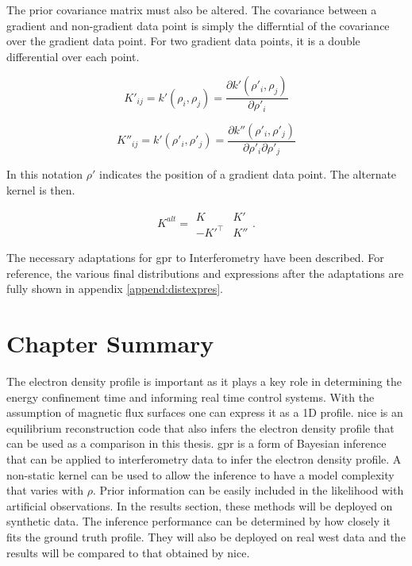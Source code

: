 \noindent The prior covariance matrix must also be altered. The covariance between a gradient and non-gradient data point is simply the differntial of the covariance over the gradient data point. For two gradient data points, it is a double differential over each point.

\begin{equation}
  K'_{ij} = k'(\rho_i, \rho_j) = \frac{\partial k'(\rho'_i, \rho_j)}{\partial \rho'_i}  
\end{equation}

\begin{equation}
  K''_{ij} = k'(\rho'_i, \rho'_j) = \frac{\partial k''(\rho'_i, \rho'_j)}{\partial \rho'_i \partial \rho'_j}  
\end{equation}

\noindent In this notation $\rho'$ indicates the position of a gradient data point. The alternate kernel is then.

\begin{equation}
  K^{alt} = 
    \begin{matrix}
      K & K'\\
      -K'^{\top} & K''
    \end{matrix}.  
\end{equation}

The necessary adaptations for \gls{gpr} to Interferometry have been described. For reference, the various final distributions and expressions after the adaptations are fully shown in appendix \ref{append:distexpres}.

\section{Chapter Summary}

The electron density profile is important as it plays a key role in determining the energy confinement time and informing real time control systems. With the assumption of magnetic flux surfaces one can express it as a 1D profile. \gls{nice} is an equilibrium reconstruction code that also infers the electron density profile that can be used as a comparison in this thesis. \gls{gpr} is a form of Bayesian inference that can be applied to interferometry data to infer the electron density profile. A non-static kernel can be used to allow the inference to have a model complexity that varies with $\rho$. Prior information can be easily included in the likelihood with artificial observations. In the results section, these methods will be deployed on synthetic data. The inference performance can be determined by how closely it fits the ground truth profile. They will also be deployed on real \gls{west} data and the results will be compared to that obtained by \gls{nice}.

